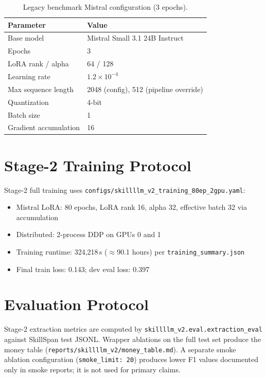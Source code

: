 \begin{table}[htbp]
  \centering
  \caption{Legacy benchmark Mistral configuration (3 epochs).}
  \label{tab:legacy-hparams}
  \begin{tabular}{ll}
    \toprule
    Parameter & Value \\
    \midrule
    Base model & Mistral Small 3.1 24B Instruct \\
    Epochs & 3 \\
    LoRA rank / alpha & 64 / 128 \\
    Learning rate & $1.2 \times 10^{-4}$ \\
    Max sequence length & 2048 (config), 512 (pipeline override) \\
    Quantization & 4-bit \\
    Batch size & 1 \\
    Gradient accumulation & 16 \\
    \bottomrule
  \end{tabular}
\end{table}

\section{Stage-2 Training Protocol}

Stage-2 full training uses \texttt{configs/skillllm\_v2\_training\_80ep\_2gpu.yaml}:

\begin{itemize}
  \item Mistral LoRA: 80 epochs, LoRA rank 16, alpha 32, effective batch 32 via accumulation
  \item Distributed: 2-process DDP on GPUs 0 and 1
  \item Training runtime: 324{,}218\,s ($\approx$90.1 hours) per \texttt{training\_summary.json}
  \item Final train loss: 0.143; dev eval loss: 0.397
\end{itemize}

\section{Evaluation Protocol}

Stage-2 extraction metrics are computed by \texttt{skillllm\_v2.eval.extraction\_eval} against SkillSpan test JSONL.
Wrapper ablations on the full test set produce the money table (\texttt{reports/skillllm\_v2/money\_table.md}).
A separate smoke ablation configuration (\texttt{smoke\_limit: 20}) produces lower F1 values documented only in smoke reports; it is not used for primary claims.

